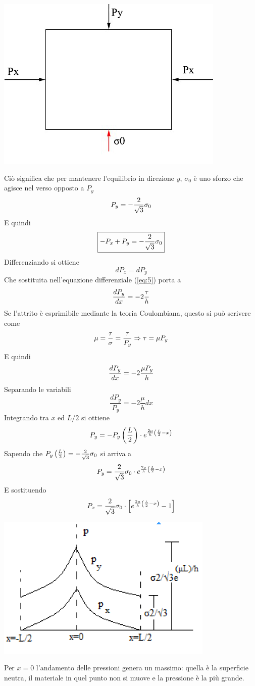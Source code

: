 \documentclass[a4paper, 15pt]{article}
\begin{document}
\begin{center}
	\includegraphics[width=0.5\linewidth]{figures/def4}
\end{center}
	Ciò significa che per mantenere l'equilibrio in direzione $y$, $\sigma_0$ è uno sforzo che agisce nel verso opposto a $P_y$
	\[P_y = -{2\over\sqrt{3}}\sigma_0\]
	E quindi 
	\begin{equation}\label{eq:labstamp}
		\boxed{-P_x+P_y = -{2\over\sqrt{3}}\sigma_0}
	\end{equation}
	Differenziando si ottiene 
	\[ dP_x = dP_y\]
	Che sostituita nell'equazione differenziale (\ref{eq:5}) porta a 
	\[\dfrac{dP_y}{dx} = -2{\tau\over h}\]
	Se l'attrito è esprimibile mediante la teoria Coulombiana, questo si può scrivere come 
	\[\mu = {\tau\over\sigma} = \dfrac{\tau}{P_y}\Rightarrow\tau = \mu P_y\]
	E quindi
	\[\dfrac{dP_y}{dx} = -2{\mu P_y\over h}\]
	Separando le variabili 
	\[\dfrac{dP_y}{P_y} = -2\dfrac{\mu}{h}dx\]
	Integrando tra $x$ ed $L/2$ si ottiene 
	\[P_y = - P_y\left(L\over2\right)\cdot e^{{2\mu\over h}\left({L\over2}-x\right)}\]
	Sapendo che $P_y\left(L\over2\right) = -{2\over\sqrt{3}}\sigma_0$ si arriva a 
	\begin{equation}\label{eq:2}
		P_y = {2\over\sqrt{3}}\sigma_0 \cdot e^{{2\mu\over h}\left({L\over2}-x\right)}
	\end{equation}
	E sostituendo
	\[P_x = {2\over\sqrt{3}}\sigma_0 \cdot \left[e^{{2\mu\over h}\left({L\over2}-x\right)}-1\right]\]
\begin{center}
	\includegraphics[width=0.5\linewidth]{figures/def5}
\end{center}
	Per $x=0$ l'andamento delle pressioni genera un massimo: quella è la superficie neutra, il materiale in quel punto non si muove e la pressione è la più grande. 
\end{document}
